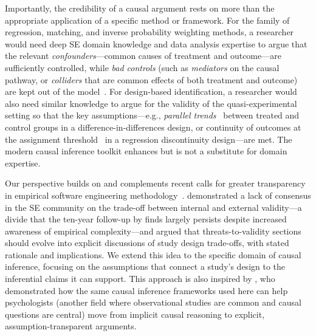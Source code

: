 Importantly, the credibility of a causal argument rests on more than the appropriate application of a specific method or framework. 
For the family of regression, matching, and inverse probability weighting methods, a researcher would need deep SE domain knowledge and data analysis expertise to argue that the relevant \emph{confounders}---common causes of treatment and outcome---are sufficiently controlled, while \emph{bad controls} (such as \emph{mediators} on the causal pathway, or \emph{colliders} that are common effects of both treatment and outcome) are kept out of the model~\cite{angrist2009mostly}.
For design-based identification, a researcher would also need similar knowledge to argue for the validity of the quasi-experimental setting so that the key assumptions---e.g., \emph{parallel trends}~\cite{roth2023whats} between treated and control groups in a difference-in-differences design, or continuity of outcomes at the assignment threshold~\cite{cunningham2021causal} in a regression discontinuity design---are met.
The modern causal inference toolkit enhances but is not a substitute for domain expertise.

Our perspective builds on and complements recent calls for greater transparency in empirical software engineering methodology~\cite{DBLP:conf/icse/SiegmundSA15, DBLP:conf/icse/MailachSAS26, DBLP:journals/tosem/RobillardAEGLNNSSS24}.
\citet{DBLP:conf/icse/SiegmundSA15} demonstrated a lack of consensus in the SE community on the trade-off between internal and external validity---a divide that the ten-year follow-up by \citet{DBLP:conf/icse/MailachSAS26} finds largely persists despite increased awareness of empirical complexity---and \citet{DBLP:journals/tosem/RobillardAEGLNNSSS24} argued that threats-to-validity sections should evolve into explicit discussions of study design trade-offs, with stated rationale and implications.
We extend this idea to the specific domain of causal inference, focusing on the assumptions that connect a study's design to the inferential claims it can support. 
This approach is also inspired by \citet{rohrer2018thinking}, who demonstrated how the same causal inference frameworks used here can help psychologists (another field where observational studies are common and causal questions are central) move from implicit causal reasoning to explicit, assumption-transparent arguments.

